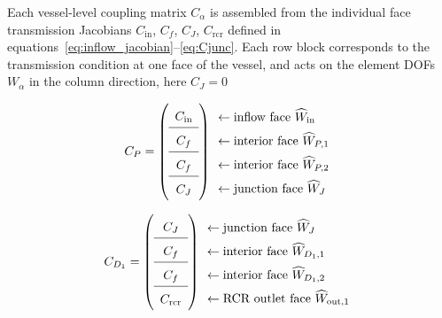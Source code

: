 \documentclass[11pt]{article}
\begin{document}
Each vessel-level coupling matrix $C_\alpha$ is assembled from
the individual face transmission Jacobians $C_{\mathrm{in}}$,
$C_f$, $C_J$, $C_{\mathrm{rcr}}$ defined in
equations~\eqref{eq:inflow_jacobian}--\eqref{eq:Cjunc}.
Each row block corresponds to the transmission condition at one
face of the vessel, and acts on the element DOFs $W_\alpha$
in the column direction, here $C_J =0$

\begin{equation}
C_P
=
\renewcommand{\arraystretch}{1.6}
\left(
\begin{array}{c}
C_{\mathrm{in}}  \\
\hline
C_{f}            \\
\hline
C_{f}            \\
\hline
C_{J}
\end{array}
\right)
\begin{array}{l}
\leftarrow \text{inflow face } \widehat{W}_{\mathrm{in}}     \\
\leftarrow \text{interior face } \widehat{W}_{P,1}           \\
\leftarrow \text{interior face } \widehat{W}_{P,2}           \\
\leftarrow \text{junction face } \widehat{W}_{J}
\end{array}
\label{eq:CP}
\end{equation}

\begin{equation}
C_{D_1}
=
\renewcommand{\arraystretch}{1.6}
\left(
\begin{array}{c}
C_{J}            \\
\hline
C_{f}            \\
\hline
C_{f}            \\
\hline
C_{\mathrm{rcr}}
\end{array}
\right)
\begin{array}{l}
\leftarrow \text{junction face } \widehat{W}_{J}             \\
\leftarrow \text{interior face } \widehat{W}_{D_1,1}         \\
\leftarrow \text{interior face } \widehat{W}_{D_1,2}         \\
\leftarrow \text{RCR outlet face } \widehat{W}_{\mathrm{out},1}
\end{array}
\label{eq:CD1}
\end{equation}
\end{document}
